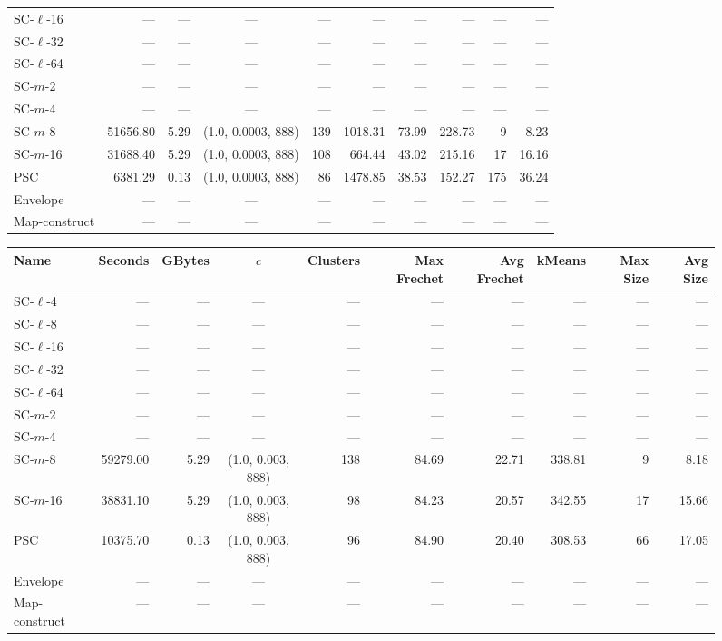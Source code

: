 \begin{figure}
\begin{center}
\begin{minipage}{\textwidth}
{\begin{tabular}{@{}lrrcrrrrrr@{}}
        SC-$\ell$-16 & --- & --- & --- & --- & --- & --- & --- & --- & ---\\
        SC-$\ell$-32 & --- & --- & --- & --- & --- & --- & --- & --- & ---\\
        SC-$\ell$-64 & --- & --- & --- & --- & --- & --- & --- & --- & ---\\
        SC-$m$-2 & --- & --- & --- & --- & --- & --- & --- & --- & ---\\
        SC-$m$-4 & --- & --- & --- & --- & --- & --- & --- & --- & ---\\
        SC-$m$-8 & 51656.80 & 5.29 & (1.0, 0.0003, 888) & 139 & 1018.31 & 73.99 & 228.73 & 9 & 8.23\\
        SC-$m$-16 & 31688.40 & 5.29 & (1.0, 0.0003, 888) & 108 & 664.44 & 43.02 & 215.16 & 17 & 16.16\\
        PSC & 6381.29 & 0.13 & (1.0, 0.0003, 888) & 86 & 1478.85 & 38.53 & 152.27 & 175 & 36.24\\
        Envelope & --- & --- & --- & --- & --- & --- & --- & --- & ---\\
        Map-construct & --- & --- & --- & --- & --- & --- & --- & --- & ---\\
        \bottomrule
    \end{tabular}
    }
    {
    \begin{tabular}{@{}lrrcrrrrrr@{}}
        \toprule
        Name & Seconds & GBytes & $c$ & Clusters & Max Frechet & Avg Frechet & kMeans & Max Size & Avg Size\\
        \midrule
        SC-$\ell$-4 & --- & --- & --- & --- & --- & --- & --- & --- & ---\\
        SC-$\ell$-8 & --- & --- & --- & --- & --- & --- & --- & --- & ---\\
        SC-$\ell$-16 & --- & --- & --- & --- & --- & --- & --- & --- & ---\\
        SC-$\ell$-32 & --- & --- & --- & --- & --- & --- & --- & --- & ---\\
        SC-$\ell$-64 & --- & --- & --- & --- & --- & --- & --- & --- & ---\\
        SC-$m$-2 & --- & --- & --- & --- & --- & --- & --- & --- & ---\\
        SC-$m$-4 & --- & --- & --- & --- & --- & --- & --- & --- & ---\\
        SC-$m$-8 & 59279.00 & 5.29 & (1.0, 0.003, 888) & 138 & 84.69 & 22.71 & 338.81 & 9 & 8.18\\
        SC-$m$-16 & 38831.10 & 5.29 & (1.0, 0.003, 888) & 98 & 84.23 & 20.57 & 342.55 & 17 & 15.66\\
        PSC & 10375.70 & 0.13 & (1.0, 0.003, 888) & 96 & 84.90 & 20.40 & 308.53 & 66 & 17.05\\
        Envelope & --- & --- & --- & --- & --- & --- & --- & --- & ---\\
        Map-construct & --- & --- & --- & --- & --- & --- & --- & --- & ---\\
        \bottomrule
    \end{tabular}
    }
    \end{minipage}


\end{center}
\end{figure}

